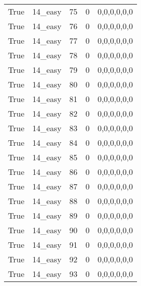 \begin{tabular}{llrrl}
 True            & 14\_easy             &            75 &                     0 & 0,0,0,0,0,0   \\
 True            & 14\_easy             &            76 &                     0 & 0,0,0,0,0,0   \\
 True            & 14\_easy             &            77 &                     0 & 0,0,0,0,0,0   \\
 True            & 14\_easy             &            78 &                     0 & 0,0,0,0,0,0   \\
 True            & 14\_easy             &            79 &                     0 & 0,0,0,0,0,0   \\
 True            & 14\_easy             &            80 &                     0 & 0,0,0,0,0,0   \\
 True            & 14\_easy             &            81 &                     0 & 0,0,0,0,0,0   \\
 True            & 14\_easy             &            82 &                     0 & 0,0,0,0,0,0   \\
 True            & 14\_easy             &            83 &                     0 & 0,0,0,0,0,0   \\
 True            & 14\_easy             &            84 &                     0 & 0,0,0,0,0,0   \\
 True            & 14\_easy             &            85 &                     0 & 0,0,0,0,0,0   \\
 True            & 14\_easy             &            86 &                     0 & 0,0,0,0,0,0   \\
 True            & 14\_easy             &            87 &                     0 & 0,0,0,0,0,0   \\
 True            & 14\_easy             &            88 &                     0 & 0,0,0,0,0,0   \\
 True            & 14\_easy             &            89 &                     0 & 0,0,0,0,0,0   \\
 True            & 14\_easy             &            90 &                     0 & 0,0,0,0,0,0   \\
 True            & 14\_easy             &            91 &                     0 & 0,0,0,0,0,0   \\
 True            & 14\_easy             &            92 &                     0 & 0,0,0,0,0,0   \\
 True            & 14\_easy             &            93 &                     0 & 0,0,0,0,0,0   \\

\end{tabular}
